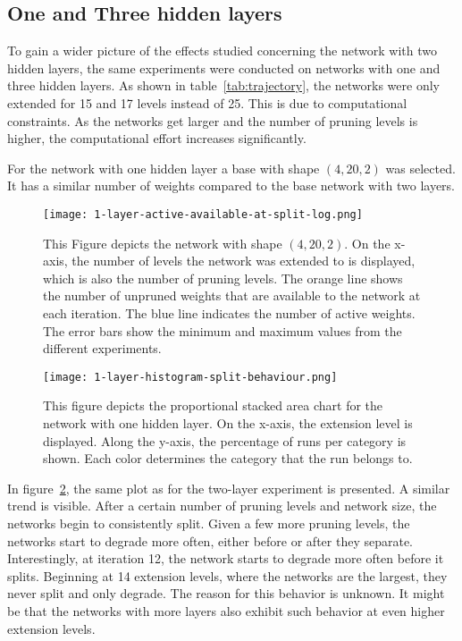 \subsection{One and Three hidden layers}
To gain a wider picture of the effects studied concerning the network with two hidden layers, the same experiments were conducted on networks with one and three hidden layers.
As shown in table~\ref{tab:trajectory}, the networks were only extended for 15 and 17 levels instead of 25. 
This is due to computational constraints. As the networks get larger and the number of pruning levels is higher, the computational effort increases significantly.

For the network with one hidden layer a base with shape $(4,20,2)$ was selected.
It has a similar number of weights compared to the base network with two layers.

\begin{figure}[ht]
    \centering
    \texttt{[image: 1-layer-active-available-at-split-log.png]}
    \caption{This Figure depicts the network with shape $(4,20,2)$.
    On the x-axis, the number of levels the network was extended to is displayed, which is also the number of pruning levels.
    The orange line shows the number of unpruned weights that are available to the network at each iteration.
    The blue line indicates the number of active weights.
    The error bars show the minimum and maximum values from the different experiments.
    }\label{fig:1layer-active}
\end{figure}

\begin{figure}[ht]
    \centering
    \texttt{[image: 1-layer-histogram-split-behaviour.png]}
    \caption{
        This figure depicts the proportional stacked area chart for the network with one hidden layer.
        On the x-axis, the extension level is displayed. 
        Along the y-axis, the percentage of runs per category is shown.
        Each color determines the category that the run belongs to.
    }\label{fig:1layer-histogram}
\end{figure}

In figure~\ref{fig:1layer-histogram}, the same plot as for the two-layer experiment is presented.
A similar trend is visible.
After a certain number of pruning levels and network size, the networks begin to consistently split.
Given a few more pruning levels, the networks start to degrade more often, either before or after they separate.
Interestingly, at iteration 12, the network starts to degrade more often before it splits.
Beginning at 14 extension levels, where the networks are the largest, they never split and only degrade.
The reason for this behavior is unknown.
It might be that the networks with more layers also exhibit such behavior at even higher extension levels. 

